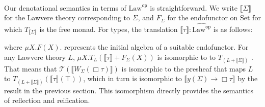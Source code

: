 \documentclass[acmsmall, screen, nonacm]{acmart}
\theoremstyle{definition}
\newcommand{\glob}{\mathop{\Box}}
\newcommand{\setc}{\mathrm{Set}}
\newcommand{\terminal}{\top}
\newcommand{\lawc}{\mathrm{Law}}
\newcommand{\lawcop}{\lawc^{\mathtt{op}}}
\newcommand{\pshlawcop}{\widehat{\lawcop}}
\newcommand{\yoneda}[1]{y(#1)}
\newcommand{\arrow}[2]{#1 \Rightarrow #2}
\newcommand{\sem}[1]{\llbracket #1 \rrbracket}
\newcommand{\mon}{\mathcal{T}}
\newcommand{\ind}[1]{W_{#1}}
\begin{document}
Our denotational semantics in terms of $\pshlawcop$ is
straightforward. We write $\sem{\Sigma}$ for the Lawvere theory
corresponding to $\Sigma$, and $F_\Sigma$ for the endofunctor on $\setc$
for which $T_{\sem{\Sigma}}$ is the free monad. For types, the
translation $\sem{\tau} \mathrel{:} \pshlawcop$ is as follows:
where $\mu X. F(X).$ represents the initial algebra of a suitable
endofunctor. For any Lawvere theory $L$,
$\mu X.T_L(\sem{\tau} + F_\Sigma(X))$ is isomorphic to to
$T_{(L + \sem{\Sigma})}$ \cite{hyland2006combining}. That means that
$\mon(\sem{\ind{\Sigma}(\glob \tau)})$ is isomorphic to the presheaf that
maps $L$ to $T_{(L + \sem{\Sigma})}(\sem{\tau}(\terminal))$, which in
turn is isomorphic to $\sem{\yoneda{\Sigma} \rightarrow \glob \tau}$ by the
result in the previous section. This isomorphism directly provides the
semantics of reflection and reification.
\end{document}
